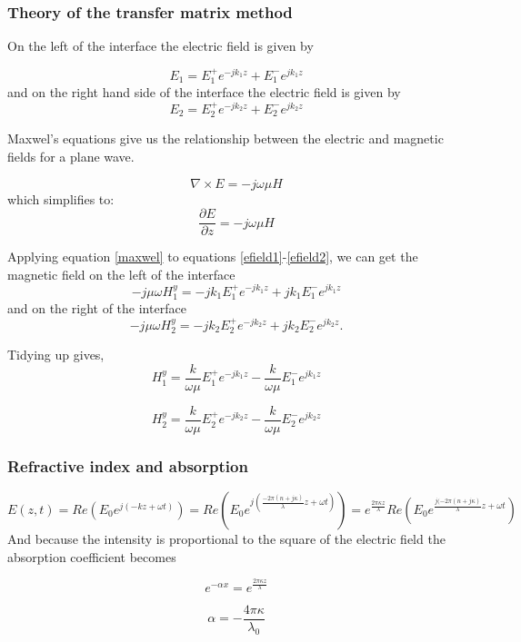 \subsubsection{Theory of the transfer matrix method}
On the left of the interface the electric field is given by

\begin{equation}
E_{1}=E^{+}_{1} e^{-j k_1 z}+E^{-}_{1} e^{j k_1 z}
\label{efield1}
\end{equation}
and on the right hand side of the interface the electric field is given by
\begin{equation}
E_{2}=E^{+}_{2} e^{-j k_2 z}+E^{-}_{2} e^{j k_2 z}
\label{efield2}
\end{equation}

Maxwel's equations give us the relationship between the electric and magnetic fields for a plane wave.

\begin{equation}
\nabla \times E=-j\omega \mu H 
\end{equation}
which simplifies to:
\begin{equation}
\frac{\partial E} {\partial z}=-j\omega \mu H 
\label{maxwel}
\end{equation}

Applying equation \ref{maxwel} to equations \ref{efield1}-\ref{efield2}, we can get the magnetic field on the left of the interface
\begin{equation}
-j \mu \omega H^{y}_{1}=-j k_1 E^{+}_{1} e^{-j k_1 z}+j k_1 E^{-}_{1} e^{j k_1 z}
\end{equation}
and on the right of the interface
\begin{equation}
-j \mu \omega H^{y}_{2}=-j k_2 E^{+}_{2} e^{-j k_2 z}+j k_2 E^{-}_{2} e^{j k_2 z}.
\end{equation}

Tidying up gives,
\begin{equation}
H^{y}_{1}=\frac{k}{\omega \mu}E^{+}_{1} e^{-j k_1 z}-\frac{k}{\omega \mu} E^{-}_{1} e^{j k_1 z}
\end{equation}

\begin{equation}
H^{y}_{2}=\frac{k}{\omega \mu}E^{+}_{2} e^{-j k_2 z}-\frac{k}{\omega \mu} E^{-}_{2} e^{j k_2 z}
\end{equation}


\subsubsection{Refractive index and absorption}
\begin{equation}
E(z,t)=Re(E_0 e^{j(-kz+\omega t)})= Re(E_0 e^{j(\frac{-2 \pi (n+j\kappa)}{\lambda}z + \omega t)})=e^{\frac{2\pi\kappa z}{\lambda}}Re(E_0 e^{\frac{j(-2 \pi (n+j\kappa)}{\lambda}z +\omega t})
\end{equation}
And because the intensity is proportional to the square of the electric field the absorption coefficient becomes

\begin{equation}
e^{-\alpha x}=e^{\frac{2\pi\kappa z}{\lambda}}
\end{equation}

\begin{equation}
\alpha=-\frac{4\pi\kappa}{\lambda_0}
\end{equation}


\newpage
\vfill

